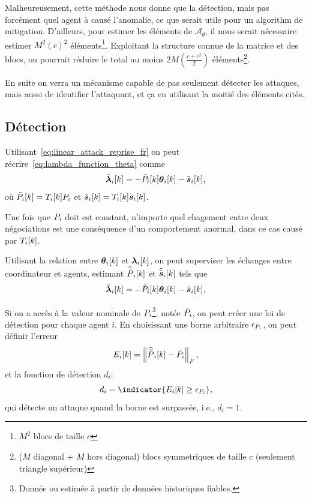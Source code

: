 \documentclass[../main.tex]{subfiles}
\begin{document}
Malheureusement, cette méthode nous donne que la détection, mais pas forcément quel agent à causé l'anomalie, ce que serait utile pour un algorithm de mitigation.
D'ailleurs, pour estimer les éléments de $\mathcal{A}_{\theta}$, il nous serait nécessaire estimer $M^{2}{(c)}^{2}$ éléments\footnote{$M^{2}$ blocs de taille ${c}$}.
Exploitant la structure connue de la matrice et des blocs, on pourrait réduire le total au moins $2M{(\frac{c+{c}^{2}}{2})}$ éléments\footnote{($M$ diagonal + $M$ hors diagonal) blocs symmetriques de taille ${c}$ (seulement triangle supérieur)}.

En suite on verra un mécanisme capable de pas seulement détecter les attaques, mais aussi de identifier l'attaquant, et ça en utilisant la moitié des éléments cités.

\subsection{Détection}\label{sec:detection-mechanism_fr}

Utilisant~\eqref{eq:linear_attack_reprise_fr} on peut récrire~\eqref{eq:lambda_function_theta} comme
\begin{equation}
  \label{eq:lambda_function_theta_tilde}
\lambdaicheat[k]=-\Plintilde\thetaik-\tilde{\vec{s}}_{i}[k],
\end{equation}
où $\tilde{P}_{i}[k]=T_{i}[k]{P}_{i}$ et $\tilde{\boldsymbol{s}}_{i}[k]=T_{i}[k]\boldsymbol{s}_{i}[k]$.

Une fois que ${P}_{i}$ doit est constant, n'importe quel chagement entre deux négociations est une conséquence d'un comportement anormal, dans ce cas causé par $T_{i}[k]$.

Utilisant la relation entre $\thetaik$ et $\lambdaik$, on peut superviser les échanges entre coordinateur et agents, estimant $\widehat{\tilde{P}}_{i}[k]$ et $\widehat{\tilde{\boldsymbol{s}}}_{i}[k]$ tels que
\begin{equation}
  \lambdaicheat[k]=-\Plintilde\thetaik-\tilde{\vec{s}}_{i}[k],
\end{equation}

Si on a accès à la valeur nominale de ${P}_{i}$\footnote{Donnée ou estimée à partir de données historiques fiables.}, notée $\bar{{P}}_{i}$, on peut créer une loi de détection pour chaque agent $i$.
En choisissant une borne arbitraire $\epsilon_{{P}_{i}}$, on peut définir l'erreur
\begin{equation}
  E_{i}[k] =\left\lVert\widehat{\tilde{P}}_{i}[k]-\bar{{P}}_{i}\right\rVert_{F},
\end{equation}
et la fonction de détection $d_{i}$:
\begin{equation}
  d_{i}=\indicator{E_{i}[k]\geq\epsilon_{\Plin}},
\end{equation}
qui détecte un attaque quand la borne est surpassée, i.e., $d_{i}=1$.
\end{document}
